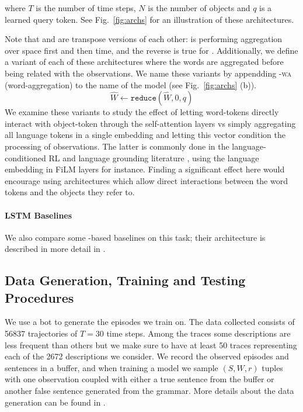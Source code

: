 where $T$ is the number of time steps, $N$ is the number of objects and $q$ is a learned query token. See Fig.~\ref{fig:archs} for an illustration of these architectures.

Note that \stm and \ttm are transpose versions of each other: \stm is performing aggregation over space first and then time, and the reverse is true for \ttm. Additionally, we define a variant of each of these architectures where the words are aggregated before being related with the observations. We name these variants by appendding -\textsc{wa} (word-aggregation) to the name of the model (see Fig.~\ref{fig:archs} (b)).
%
\[\hat{W} \leftarrow \texttt{reduce}(\hat{W}, 0, q)\]
%
We examine these variants to study the effect of letting word-tokens directly interact with object-token through the self-attention layers vs simply aggregating all language tokens in a single embedding and letting this vector condition the processing of observations. The latter is commonly done in the language-conditioned RL and language grounding literature \cite{chevalierboisvert2019babyai, bahdanau2019learning, hui2020babyai, ruis2020benchmark}, using the language embedding in FiLM layers \cite{perez2017film} for instance. Finding a significant effect here would encourage using architectures which allow direct interactions between the word tokens and the objects they refer to.

\paragraph{LSTM Baselines}

We also compare some \lstm-based baselines on this task; their architecture is described in more detail in .

\subsection{Data Generation, Training and Testing Procedures}

We use a bot to generate the episodes we train on. The data collected consists of 56837 trajectories of $T=30$ time steps. Among the traces some descriptions are less frequent than others but we make sure to have at least 50 traces representing each of the 2672 descriptions we consider. We record the observed episodes and sentences in a buffer, and when training a model we sample $(S, W, r)$ tuples with one observation coupled with either a true sentence from the buffer or another false sentence generated from the grammar.  More details about the data generation can be found in .

